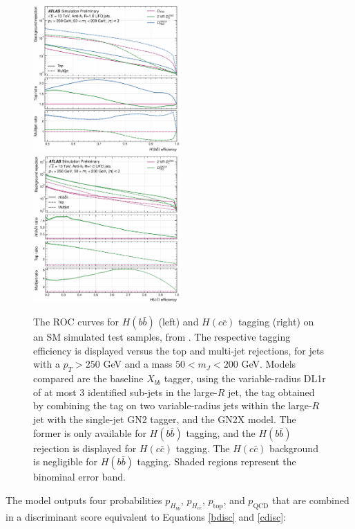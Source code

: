 \begin{center}
  \begin{figure}[h!]
  \centerline{
  \includegraphics[width=0.50\textwidth]{Images/FTAG/GN2X/roc/rocHbb.pdf}
  \includegraphics[width=0.50\textwidth]{Images/FTAG/GN2X/roc/rocHcc.pdf}
  }
  \caption{The ROC curves for $H(b\bar{b})$ (left) and $H(c\bar{c})$ tagging (right) on an SM simulated test samples, from \cite{ATL-PHYS-PUB-2023-021}. The respective tagging efficiency is displayed versus the top and multi-jet rejections, for jets with a $p_T > 250$ GeV and a mass $50 < m_J < 200$ GeV. Models compared are the baseline $X_{bb}$ tagger, using the variable-radius DL1r of at most 3 identified sub-jets in the large-$R$ jet, the tag obtained by combining the tag on two variable-radius jets within the large-$R$ jet with the single-jet GN2 tagger, and the GN2X model. The former is only available for $H(b\bar{b})$ tagging, and the $H(b\bar{b})$ rejection is displayed for $H(c\bar{c})$ tagging. The $H(c\bar{c})$ background is negligible for $H(b\bar{b})$ tagging. Shaded regions represent the binominal error band.}
  \label{fig:rocGN2X}
  \end{figure}
\end{center}
The model outputs four probabilities $p_{H_{b\bar{b}}}$, $p_{H_{c\bar{c}}}$, $p_{\textrm{top}}$, and $p_{\textrm{QCD}}$ that are combined in a discriminant score equivalent to Equations \ref{bdisc} and \ref{cdisc}: 
